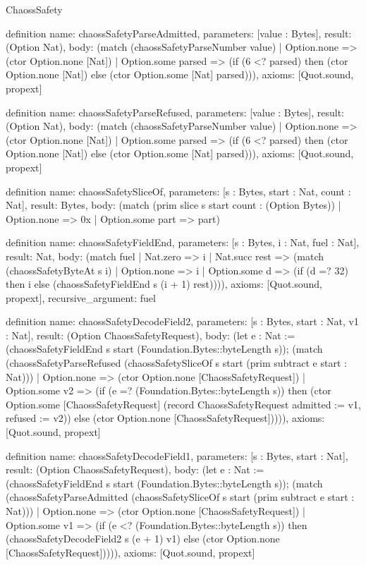 \begin{lexlean}{ChaossSafety}
\begin{semanticmodule}
definition{
  name: chaossSafetyParseAdmitted,
  parameters: [value : Bytes],
  result: (Option Nat),
  body: (match (chaossSafetyParseNumber value)
    | Option.none => (ctor Option.none [Nat])
    | Option.some parsed => (if (6 <? parsed) then (ctor Option.none [Nat]) else (ctor Option.some [Nat] parsed))),
  axioms: [Quot.sound, propext]
}

definition{
  name: chaossSafetyParseRefused,
  parameters: [value : Bytes],
  result: (Option Nat),
  body: (match (chaossSafetyParseNumber value)
    | Option.none => (ctor Option.none [Nat])
    | Option.some parsed => (if (6 <? parsed) then (ctor Option.none [Nat]) else (ctor Option.some [Nat] parsed))),
  axioms: [Quot.sound, propext]
}

definition{
  name: chaossSafetySliceOf,
  parameters: [s : Bytes, start : Nat, count : Nat],
  result: Bytes,
  body: (match (prim slice s start count : (Option Bytes))
    | Option.none => 0x
    | Option.some part => part)
}

definition{
  name: chaossSafetyFieldEnd,
  parameters: [s : Bytes, i : Nat, fuel : Nat],
  result: Nat,
  body: (match fuel
    | Nat.zero => i
    | Nat.succ rest => (match (chaossSafetyByteAt s i)
      | Option.none => i
      | Option.some d => (if (d =? 32) then i else (chaossSafetyFieldEnd s (i + 1) rest)))),
  axioms: [Quot.sound, propext],
  recursive_argument: fuel
}

definition{
  name: chaossSafetyDecodeField2,
  parameters: [s : Bytes, start : Nat, v1 : Nat],
  result: (Option ChaossSafetyRequest),
  body: (let e : Nat := (chaossSafetyFieldEnd s start (Foundation.Bytes::byteLength s)); (match (chaossSafetyParseRefused (chaossSafetySliceOf s start (prim subtract e start : Nat)))
    | Option.none => (ctor Option.none [ChaossSafetyRequest])
    | Option.some v2 => (if (e =? (Foundation.Bytes::byteLength s)) then (ctor Option.some [ChaossSafetyRequest] (record ChaossSafetyRequest {admitted := v1, refused := v2})) else (ctor Option.none [ChaossSafetyRequest])))),
  axioms: [Quot.sound, propext]
}

definition{
  name: chaossSafetyDecodeField1,
  parameters: [s : Bytes, start : Nat],
  result: (Option ChaossSafetyRequest),
  body: (let e : Nat := (chaossSafetyFieldEnd s start (Foundation.Bytes::byteLength s)); (match (chaossSafetyParseAdmitted (chaossSafetySliceOf s start (prim subtract e start : Nat)))
    | Option.none => (ctor Option.none [ChaossSafetyRequest])
    | Option.some v1 => (if (e <? (Foundation.Bytes::byteLength s)) then (chaossSafetyDecodeField2 s (e + 1) v1) else (ctor Option.none [ChaossSafetyRequest])))),
  axioms: [Quot.sound, propext]
}


\end{semanticmodule}
\end{lexlean}
